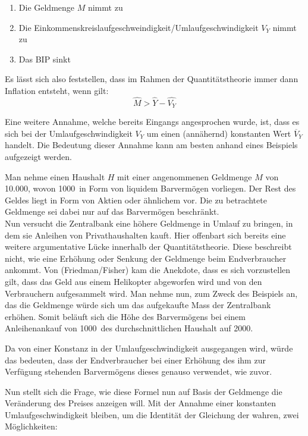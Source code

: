 \begin{enumerate}
    \item Die Geldmenge $M$ nimmt zu
    \item Die Einkommenskreislaufgeschweindigkeit/Umlaufgeschwindigkeit $V_Y$ nimmt zu
    \item Das BIP sinkt
\end{enumerate}

Es lässt sich also feststellen, dass im Rahmen der Quantitätstheorie immer dann Inflation entsteht, wenn gilt:
    \[
        \widehat{M} > \widehat{Y} - \widehat{V_Y}
    \]

Eine weitere Annahme, welche bereits Eingangs angesprochen wurde, ist, dass es sich bei der Umlaufgeschwindigkeit $V_Y$ um einen (annähernd) konstanten Wert $\overline{V}_Y$ handelt. Die Bedeutung dieser Annahme kann am besten anhand eines Beispiels aufgezeigt werden.

\begin{example}
    Man nehme einen Haushalt $H$ mit einer angenommenen Geldmenge $M$ von 10.000\EUR, wovon 1000\EUR\ in Form von liquidem Barvermögen vorliegen. Der Rest des Geldes liegt in Form von Aktien oder ähnlichem vor. Die zu betrachtete Geldmenge sei dabei nur auf das Barvermögen beschränkt. \\
    Nun versucht die Zentralbank eine höhere Geldmenge in Umlauf zu bringen, in dem sie Anleihen von Privathaushalten kauft. Hier offenbart sich bereits eine weitere argumentative Lücke innerhalb der Quantitätstheorie. Diese beschreibt nicht, wie eine Erhöhung oder Senkung der Geldmenge beim Endverbraucher ankommt. Von (Friedman/Fisher) kam die Anekdote, dass es sich vorzustellen gilt, dass das Geld aus einem Helikopter abgeworfen wird und von den Verbrauchern aufgesammelt wird. Man nehme nun, zum Zweck des Beispiels an, das die Geldmenge würde sich um das aufgekaufte Mass der Zentralbank erhöhen. Somit beläuft sich die Höhe des Barvermögens bei einem Anleihenankauf von 1000\EUR\, des durchschnittlichen Haushalt auf 2000\EUR. 

    Da von einer Konstanz in der Umlaufgeschwindigkeit ausgegangen wird, würde das bedeuten, dass der Endverbraucher bei einer Erhöhung des ihm zur Verfügung stehenden Barvermögens dieses genauso verwendet, wie zuvor. 
\end{example}\label{Bsp.kUmlauf}

Nun stellt sich die Frage, wie diese Formel nun auf Basis der Geldmenge die Veränderung des Preises anzeigen will. Mit der Annahme einer konstanten Umlaufgeschwindigkeit bleiben, um die Identität der Gleichung der wahren, zwei Möglichkeiten:

